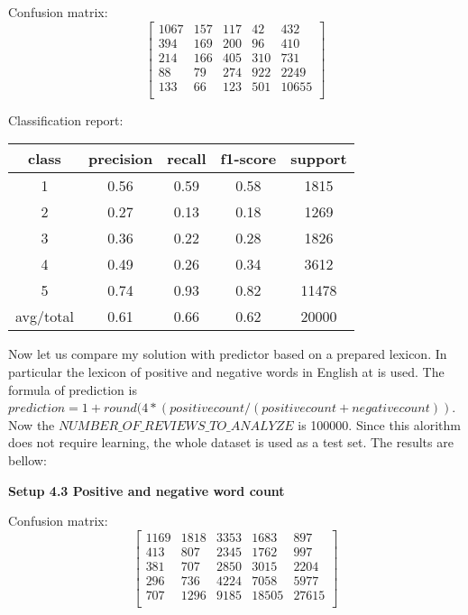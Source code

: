 \documentclass[12pt]{report}
\begin{document}
Confusion matrix:
\[
\begin{bmatrix}
1067 & 157 & 117 & 42 & 432 \\
394 & 169 & 200 & 96 & 410 \\
214 & 166 & 405 & 310 & 731 \\
88 & 79  & 274 & 922 & 2249 \\
133 & 66 & 123 & 501 & 10655 \\
\end{bmatrix}
\]

Classification report:

\begin{center}
	\begin{tabular}{c | c | c | c | c }
		\hline
		class & precision & recall & f1-score & support \\ \hline
		1 & 0.56 & 0.59 & 0.58 & 1815 \\ \hline
		2 & 0.27 & 0.13 & 0.18 & 1269 \\ \hline
		3 & 0.36 & 0.22 & 0.28 & 1826 \\ \hline
		4 & 0.49 & 0.26 & 0.34 & 3612 \\ \hline
		5 & 0.74 & 0.93 & 0.82 & 11478 \\ \hline
		avg/total & 0.61 & 0.66 & 0.62 & 20000 \\ \hline
	\end{tabular}
\end{center}


Now let us compare my solution with predictor based on a prepared lexicon. In particular the lexicon of positive and negative words in English at \cite{pos-neg} is used. The formula of prediction is $prediction = 1 + round(4 * (positive count / (positive count + negative count))$. Now the $NUMBER\_OF\_REVIEWS\_TO\_ANALYZE$ is 100000. Since this alorithm does not require learning, the whole dataset is used as a test set. The results are bellow:

\bigbreak

\textbf{Setup 4.3 Positive and negative word count}

Confusion matrix:
\[
\begin{bmatrix}
1169 & 1818 & 3353 & 1683 & 897 \\
413 & 807 & 2345 & 1762 & 997 \\
381 & 707 & 2850 & 3015 & 2204 \\
296 & 736 & 4224 & 7058 & 5977 \\
707 & 1296 & 9185 & 18505 & 27615 \\
\end{bmatrix}
\]
\end{document}
